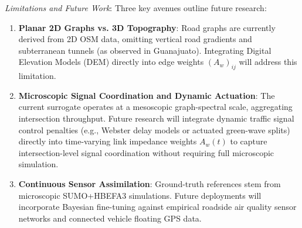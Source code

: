 \documentclass[journal]{IEEEtran}
\begin{document}
\textit{Limitations and Future Work}: Three key avenues outline future research:
\begin{enumerate}
    \item \textbf{Planar 2D Graphs vs. 3D Topography}: Road graphs are currently derived from 2D OSM data, omitting vertical road gradients and subterranean tunnels (as observed in Guanajuato). Integrating Digital Elevation Models (DEM) directly into edge weights $(A_w)_{ij}$ will address this limitation.
    \item \textbf{Microscopic Signal Coordination and Dynamic Actuation}: The current surrogate operates at a mesoscopic graph-spectral scale, aggregating intersection throughput. Future research will integrate dynamic traffic signal control penalties (e.g., Webster delay models or actuated green-wave splits) directly into time-varying link impedance weights $A_w(t)$ to capture intersection-level signal coordination without requiring full microscopic simulation.
    \item \textbf{Continuous Sensor Assimilation}: Ground-truth references stem from microscopic SUMO+HBEFA3 simulations. Future deployments will incorporate Bayesian fine-tuning against empirical roadside air quality sensor networks and connected vehicle floating GPS data.
\end{enumerate}
\end{document}
